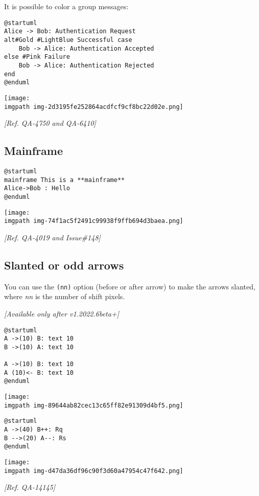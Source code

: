 It is possible to color a group messages:


\begin{verbatim}
@startuml
Alice -> Bob: Authentication Request
alt#Gold #LightBlue Successful case
    Bob -> Alice: Authentication Accepted
else #Pink Failure
    Bob -> Alice: Authentication Rejected
end
@enduml
\end{verbatim}
\begin{center}
\texttt{[image: \\imgpath img-2d3195fe252864acdfcf9cf8bc22d02e.png]}
\end{center}
\textit{[Ref. QA-4750 and QA-6410]}
%
%
\subsection{Mainframe}


\begin{verbatim}
@startuml
mainframe This is a **mainframe**
Alice->Bob : Hello
@enduml
\end{verbatim}
\begin{center}
\texttt{[image: \\imgpath img-74f1ac5f2491c99938f9ffb694d3baea.png]}
\end{center}


\textit{[Ref. QA-4019 and Issue\#148]}
%
%
\subsection{Slanted or odd arrows }


You can use the \texttt{(nn)} option (before or after arrow) to make the arrows slanted, where \textit{nn} is the number of shift pixels.


\textit{[Available only after v1.2022.6beta+]}


\begin{verbatim}
@startuml
A ->(10) B: text 10
B ->(10) A: text 10

A ->(10) B: text 10
A (10)<- B: text 10
@enduml
\end{verbatim}
\begin{center}
\texttt{[image: \\imgpath img-89644ab82cec13c65ff82e91309d4bf5.png]}
\end{center}


\begin{verbatim}
@startuml
A ->(40) B++: Rq
B -->(20) A--: Rs
@enduml
\end{verbatim}
\begin{center}
\texttt{[image: \\imgpath img-d47da36df96c90f3d60a47954c47f642.png]}
\end{center}
\textit{[Ref. QA-14145]}


